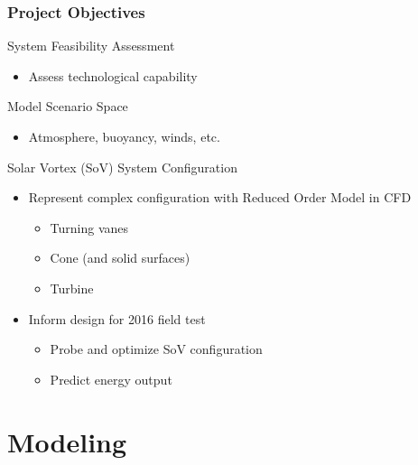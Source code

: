 \documentclass[mathserif]{beamer}
\begin{document}
%
%
%
\begin{frame}
\frametitle{Project Objectives}

 \begin{block}{System Feasibility Assessment}
  \begin{itemize}
   \item Assess technological capability
  \end{itemize}
 \end{block}


 \begin{block}{Model Scenario Space}
  \begin{itemize}
   \item Atmosphere, buoyancy, winds, etc. 
  \end{itemize}
  \end{block}

 \begin{block}{Solar Vortex (SoV) System Configuration}
 \begin{itemize}
  \item Represent complex configuration with Reduced Order Model in CFD
	\begin{itemize}
	 \item Turning vanes
	 \item Cone (and solid surfaces)
	 \item Turbine
	\end{itemize}
  \item Inform design for 2016 field test
	\begin{itemize}
	 \item Probe and optimize SoV configuration
	 \item Predict energy output
	\end{itemize}
 \end{itemize}
 \end{block}

\end{frame}



\section{Modeling}
%
%
\end{document}
